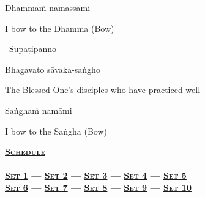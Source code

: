 Dhammaṁ namassāmi

\begin{english}
  I bow to the Dhamma \hfill{\textnormal{\ifafiveversion\fontsize{12.5}{18}\fi\ifasixversion\fontsize{9}{13}\fi\selectfont (Bow)}}
\end{english}

\begin{leader}
  \anglebracketleft\ \hspace{-0.5mm}Supaṭipanno \hspace{-0.5mm}\anglebracketright\
\end{leader}

\vspace{-0.5cm}

Bhagavato sāvaka-saṅgho

\begin{english}
  The Blessed One's disciples who have practiced well
\end{english}

Saṅghaṁ namāmi

\begin{english}
  I bow to the Saṅgha \hfill{\textnormal{\ifafiveversion\fontsize{12.5}{18}\fi\ifasixversion\fontsize{9}{13}\fi\selectfont (Bow)}}\\
\end{english}

\suttaRef{[Thai]}

\null
\vfill

\ifdigitalversion
  \begin{minipage}[b][25pt][c]{\linewidth}
    \begin{leader}
      \textbf{\vspace{0.2em}\textsc{\hyperref[schedule]{Schedule}\\
          {\centering{}}\\
          \vspace{0.8em}
          \hyperref[buddhas-first-exclamation]{Set 1} \hspace{0.02cm} — \hspace{0.02cm} \hyperref[characteristic-of-not-self]{Set 2} \hspace{0.02cm} — \hspace{0.02cm} \hyperref[noble-eightfold-path]{Set 3} \hspace{0.02cm} — \hspace{0.02cm} \hyperref[dedication-of-offerings]{Set 4} \hspace{0.02cm} — \hspace{0.02cm} \hyperref[mindfulness-of-breathing]{Set 5}\\
          \vspace{0.5em}
          \hyperref[anatta-lakkhana]{Set 6} — \hyperref[dependent-origination]{Set 7} — \hyperref[aditta-pariyaya]{Set 8} — \hyperref[deva-aradhana]{Set 9} — \hyperref[pubba-bhaga-nama-kara-patho-funeral]{Set 10}}}
    \end{leader}
  \end{minipage}
\fi


